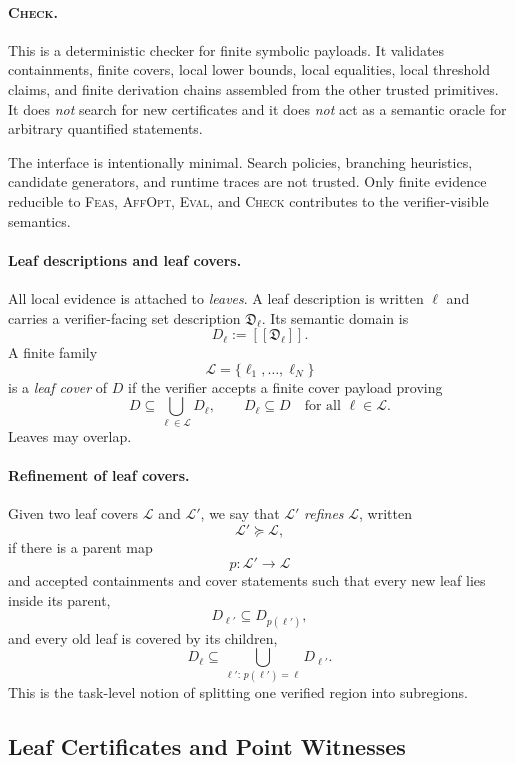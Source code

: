 \paragraph{\normalfont\textsc{Check}.}
This is a deterministic checker for finite symbolic payloads. It validates containments, finite covers, local lower bounds, local equalities, local threshold claims, and finite derivation chains assembled from the other trusted primitives. It does \emph{not} search for new certificates and it does \emph{not} act as a semantic oracle for arbitrary quantified statements.

The interface is intentionally minimal. Search policies, branching heuristics, candidate generators, and runtime traces are not trusted. Only finite evidence reducible to \textsc{Feas}, \textsc{AffOpt}, \textsc{Eval}, and \textsc{Check} contributes to the verifier-visible semantics.

\paragraph{Leaf descriptions and leaf covers.}
All local evidence is attached to \emph{leaves}. A leaf description is written $\ell$ and carries a verifier-facing set description $\mathfrak D_\ell$. Its semantic domain is
\[
D_\ell := [\![\mathfrak D_\ell]\!].
\]
A finite family
\[
\mathcal L=\{\ell_1,\dots,\ell_N\}
\]
is a \emph{leaf cover} of $D$ if the verifier accepts a finite cover payload proving
\[
D\subseteq \bigcup_{\ell\in\mathcal L} D_\ell,
\qquad
D_\ell\subseteq D\quad \text{for all }\ell\in\mathcal L.
\]
Leaves may overlap.

\paragraph{Refinement of leaf covers.}
Given two leaf covers $\mathcal L$ and $\mathcal L'$, we say that $\mathcal L'$ \emph{refines} $\mathcal L$, written
\[
\mathcal L'\succeq \mathcal L,
\]
if there is a parent map
\[
p:\mathcal L'\to \mathcal L
\]
and accepted containments and cover statements such that every new leaf lies inside its parent,
\[
D_{\ell'}\subseteq D_{p(\ell')},
\]
and every old leaf is covered by its children,
\[
D_\ell\subseteq \bigcup_{\ell':\,p(\ell')=\ell} D_{\ell'}.
\]
This is the task-level notion of splitting one verified region into subregions.

\subsection{Leaf Certificates and Point Witnesses}

